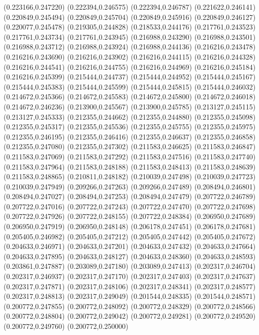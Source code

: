 (0.223166,0.247220)
(0.222394,0.246575)
(0.222394,0.246787)
(0.221622,0.246141)
(0.220849,0.245494)
(0.220849,0.245704)
(0.220849,0.245916)
(0.220849,0.246127)
(0.220077,0.245478)
(0.219305,0.244828)
(0.218533,0.244176)
(0.217761,0.243523)
(0.217761,0.243734)
(0.217761,0.243945)
(0.216988,0.243290)
(0.216988,0.243501)
(0.216988,0.243712)
(0.216988,0.243924)
(0.216988,0.244136)
(0.216216,0.243478)
(0.216216,0.243690)
(0.216216,0.243902)
(0.216216,0.244115)
(0.216216,0.244328)
(0.216216,0.244541)
(0.216216,0.244755)
(0.216216,0.244969)
(0.216216,0.245184)
(0.216216,0.245399)
(0.215444,0.244737)
(0.215444,0.244952)
(0.215444,0.245167)
(0.215444,0.245383)
(0.215444,0.245599)
(0.215444,0.245815)
(0.215444,0.246032)
(0.214672,0.245366)
(0.214672,0.245583)
(0.214672,0.245800)
(0.214672,0.246018)
(0.214672,0.246236)
(0.213900,0.245567)
(0.213900,0.245785)
(0.213127,0.245115)
(0.213127,0.245333)
(0.212355,0.244662)
(0.212355,0.244880)
(0.212355,0.245098)
(0.212355,0.245317)
(0.212355,0.245536)
(0.212355,0.245755)
(0.212355,0.245975)
(0.212355,0.246195)
(0.212355,0.246416)
(0.212355,0.246637)
(0.212355,0.246858)
(0.212355,0.247080)
(0.212355,0.247302)
(0.211583,0.246625)
(0.211583,0.246847)
(0.211583,0.247069)
(0.211583,0.247292)
(0.211583,0.247516)
(0.211583,0.247740)
(0.211583,0.247964)
(0.211583,0.248188)
(0.211583,0.248413)
(0.211583,0.248639)
(0.211583,0.248865)
(0.210811,0.248182)
(0.210039,0.247498)
(0.210039,0.247723)
(0.210039,0.247949)
(0.209266,0.247263)
(0.209266,0.247489)
(0.208494,0.246801)
(0.208494,0.247027)
(0.208494,0.247253)
(0.208494,0.247479)
(0.207722,0.246789)
(0.207722,0.247016)
(0.207722,0.247243)
(0.207722,0.247470)
(0.207722,0.247698)
(0.207722,0.247926)
(0.207722,0.248155)
(0.207722,0.248384)
(0.206950,0.247689)
(0.206950,0.247919)
(0.206950,0.248148)
(0.206178,0.247451)
(0.206178,0.247681)
(0.205405,0.246982)
(0.205405,0.247212)
(0.205405,0.247442)
(0.205405,0.247672)
(0.204633,0.246971)
(0.204633,0.247201)
(0.204633,0.247432)
(0.204633,0.247664)
(0.204633,0.247895)
(0.204633,0.248127)
(0.204633,0.248360)
(0.204633,0.248593)
(0.203861,0.247887)
(0.203089,0.247180)
(0.203089,0.247413)
(0.202317,0.246704)
(0.202317,0.246937)
(0.202317,0.247170)
(0.202317,0.247403)
(0.202317,0.247637)
(0.202317,0.247871)
(0.202317,0.248106)
(0.202317,0.248341)
(0.202317,0.248577)
(0.202317,0.248813)
(0.202317,0.249049)
(0.201544,0.248335)
(0.201544,0.248571)
(0.200772,0.247855)
(0.200772,0.248092)
(0.200772,0.248329)
(0.200772,0.248566)
(0.200772,0.248804)
(0.200772,0.249042)
(0.200772,0.249281)
(0.200772,0.249520)
(0.200772,0.249760)
(0.200772,0.250000)
